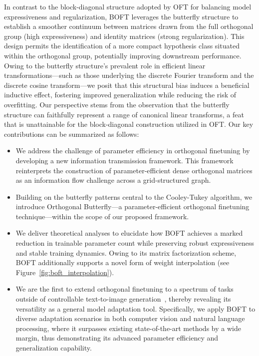In contrast to the block-diagonal structure adopted by OFT for balancing model expressiveness and regularization, BOFT leverages the butterfly structure to establish a smoother continuum between matrices drawn from the full orthogonal group (high expressiveness) and identity matrices (strong regularization). This design permits the identification of a more compact hypothesis class situated within the orthogonal group, potentially improving downstream performance. Owing to the butterfly structure's prevalent role in efficient linear transformations—such as those underlying the discrete Fourier transform and the discrete cosine transform—we posit that this structural bias induces a beneficial inductive effect, fostering improved generalization while reducing the risk of overfitting. Our perspective stems from the observation that the butterfly structure can faithfully represent a range of canonical linear transforms, a feat that is unattainable for the block-diagonal construction utilized in OFT. Our key contributions can be summarized as follows:

\begin{itemize}[leftmargin=*,nosep]
    \item We address the challenge of parameter efficiency in orthogonal finetuning by developing a new information transmission framework. This framework reinterprets the construction of parameter-efficient dense orthogonal matrices as an information flow challenge across a grid-structured graph.
    \item Building on the butterfly patterns central to the Cooley-Tukey algorithm, we introduce Orthogonal Butterfly—a parameter-efficient orthogonal finetuning technique—within the scope of our proposed framework.
    \item We deliver theoretical analyses to elucidate how BOFT achieves a marked reduction in trainable parameter count while preserving robust expressiveness and stable training dynamics. Owing to its matrix factorization scheme, BOFT additionally supports a novel form of weight interpolation (see Figure~\ref{fig:boft_interpolation}).
    \item We are the first to extend orthogonal finetuning to a spectrum of tasks outside of controllable text-to-image generation~\cite{qiu2023controlling}, thereby revealing its versatility as a general model adaptation tool. Specifically, we apply BOFT to diverse adaptation scenarios in both computer vision and natural language processing, where it surpasses existing state-of-the-art methods by a wide margin, thus demonstrating its advanced parameter efficiency and generalization capability.
\end{itemize}

